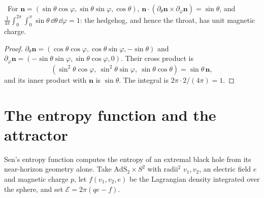 \begin{proposition}\label{prop:degree}\ver\
For $\mathbf n=(\sin\theta\cos\varphi,\sin\theta\sin\varphi,\cos\theta)$, $\mathbf n\cdot(\partial_\theta\mathbf n\times\partial_\varphi\mathbf n)=\sin\theta$, and $\frac1{4\pi}\int_0^{2\pi}\!\!\int_0^\pi\sin\theta\,\dd\theta\,\dd\varphi=1$: the hedgehog, and hence the throat, has unit magnetic charge.
\end{proposition}
\begin{proof}
$\partial_\theta\mathbf n=(\cos\theta\cos\varphi,\cos\theta\sin\varphi,-\sin\theta)$ and $\partial_\varphi\mathbf n=(-\sin\theta\sin\varphi,\sin\theta\cos\varphi,0)$. Their cross product is
\[
(\sin^2\theta\cos\varphi,\ \sin^2\theta\sin\varphi,\ \sin\theta\cos\theta)=\sin\theta\,\mathbf n ,
\]
and its inner product with $\mathbf n$ is $\sin\theta$. The integral is $2\pi\cdot2/(4\pi)=1$.
\end{proof}


\section{The entropy function and the attractor}

Sen's entropy function \cite{Sen2005} computes the entropy of an extremal black hole from its near-horizon geometry alone. Take $\mathrm{AdS}_2\times S^2$ with radii$^2$ $v_1,v_2$, an electric field $e$ and magnetic charge $p$, let $f(v_1,v_2,e)$ be the Lagrangian density integrated over the sphere, and set $\mathcal E=2\pi(qe-f)$.

